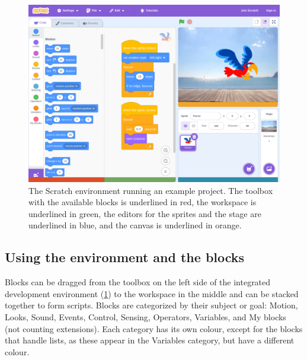 \documentclass[../main]{subfiles}
\begin{document}
\begin{figure}
    \begin{wide}
        \includegraphics[width=\linewidth]{./scratch-ide}
    \end{wide}
    \caption{The Scratch environment running an example project.
    The toolbox with the available blocks is underlined in \textcolor{ugent-re}{red}, the workspace is underlined in \textcolor{ugent-ps}{green}, the editors for the sprites and the stage are underlined in \textcolor{ugent-we}{blue}, and the canvas is underlined in \textcolor{ugent-lw}{orange}.}
    \label{fig:scratch-environment}
\end{figure}

\subsection{Using the environment and the blocks}\label{subsec:using-the-environment-and-the-blocks}

Blocks can be dragged from the toolbox on the left side of the integrated development environment (\cref{fig:scratch-environment}) to the workspace in the middle and can be stacked together to form scripts.
Blocks are categorized by their subject or goal: \textcolor{scrmove}{Motion}, \textcolor{scrlook}{Looks}, \textcolor{scrsound}{Sound}, \textcolor{screvent}{Events}, \textcolor{scrcontrol}{Control}, \textcolor{scrsensing}{Sensing}, \textcolor{scroperator}{Operators}, \textcolor{scrvariable}{Variables}, and \textcolor{scrmoreblocks}{My blocks} (not counting extensions).
Each category has its own colour, except for the blocks that handle lists, as these appear in the \textcolor{scrvariable}{Variables} category, but have a different colour.
\end{document}
